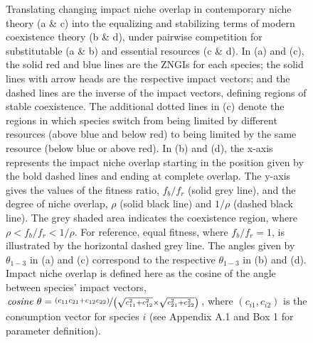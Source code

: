 \newpage
\begin{figure}[h!]
\centering
{}
\caption[Translating changing impact niche overlap in contemporary niche theory into the equalizing and stabilizing terms of modern coexistence theory, under pairwise competition for substitutable and essential resources.]
	{\hspace{1mm}Translating changing impact niche overlap in contemporary niche theory (a \& c) into the equalizing and stabilizing terms of modern coexistence theory (b \& d), under pairwise competition for substitutable (a \& b) and essential resources (c \& d). In (a) and (c), the solid red and blue lines are the ZNGIs for each species; the solid lines with arrow heads are the respective impact vectors; and the dashed lines are the inverse of the impact vectors, defining regions of stable coexistence. The additional dotted lines in (c) denote the regions in which species switch from being limited by different resources (above blue and below red) to being limited by the same resource (below blue or above red). In (b) and (d), the x-axis represents the impact niche overlap starting in the position given by the bold dashed lines and ending at complete overlap. The y-axis gives the values of the fitness ratio, $f_{b}/f_{r}$ (solid grey line), and the degree of niche overlap, $\rho$ (solid black line) and $1/\rho$ (dashed black line). The grey shaded area indicates the coexistence region, where $\rho<f_{b}/f_{r}<1/\rho$. For reference, equal fitness, where $f_{b}/f_{r}=1$, is illustrated by the horizontal dashed grey line. The angles given by $\theta_{1-3}$ in (a) and (c) correspond to the respective $\theta_{1-3}$ in (b) and (d). Impact niche overlap is defined here as the cosine of the angle between species' impact vectors, $\mathit{cosine}\ \theta = \nicefrac{\left( c_{11}c_{21}+c_{12}c_{22} \right)}{\left( \sqrt{c_{11}^{2}+c_{12}^{2}}\times \sqrt{c_{21}^{2}+c_{22}^{2}} \right)}$, where $\left (c_{i1}, c_{i2}\right )$ is the consumption vector for species $\mathit{i}$ (see Appendix A.1 and Box 1 for parameter definition).}

\end{figure}
